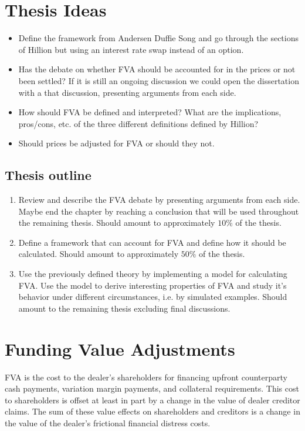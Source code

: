 \documentclass[10pt,a4paper]{article}
\begin{document}
    \tableofcontents
    \section{Thesis Ideas}
        \begin{itemize}
            \item Define the framework from Andersen Duffie Song and go through the sections of Hillion but using an interest rate swap instead of an option.
            \item Has the debate on whether FVA should be accounted for in the prices or not been settled? If it is still an ongoing discussion we could open the dissertation with a that discussion, presenting arguments from each side. 
            \item How should FVA be defined and interpreted? What are the implications, pros/cons, etc. of the three different definitions defined by Hillion?
            \item Should prices be adjusted for FVA or should they not.
        \end{itemize}

        \subsection{Thesis outline}
            \begin{enumerate}
                \item Review and describe the FVA debate by presenting arguments from each side. Maybe end the chapter by reaching a conclusion that will be used throughout the remaining thesis. Should amount to approximately $10\%$ of the thesis.
                \item Define a framework that can account for FVA and define how it should be calculated. Should amount to approximately $50\%$ of the thesis.
                \item Use the previously defined theory by implementing a model for calculating FVA. Use the model to derive interesting properties of FVA and study it's behavior under different circumstances, i.e. by simulated examples. Should amount to the remaining thesis excluding final discussions.
            \end{enumerate}

    \section{Funding Value Adjustments}
        FVA is the cost to the dealer's shareholders for financing upfront counterparty cash payments, variation margin payments, and collateral requirements. This cost to shareholders is offset at least in part by a change in the value of dealer creditor claims. The sum of these value effects on shareholders and creditors is a change in the value of the dealer's frictional financial distress costs. 
\end{document}
